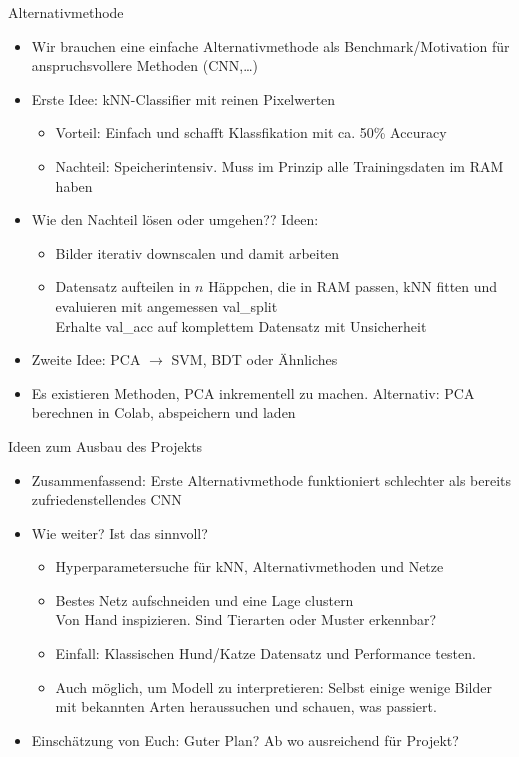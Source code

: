\documentclass[aspectratio=1610, 9pt]{beamer}
\begin{document}
\begin{frame}{Alternativmethode}

  \begin{itemize}
    \item Wir brauchen eine einfache Alternativmethode als Benchmark/Motivation für anspruchsvollere Methoden (CNN,\ldots)
    \item Erste Idee: kNN-Classifier mit reinen Pixelwerten
    \begin{itemize}
      \item Vorteil: Einfach und schafft Klassfikation mit ca. 50\% Accuracy
      \item Nachteil: Speicherintensiv. Muss im Prinzip alle Trainingsdaten im RAM haben
    \end{itemize}
    \item Wie den Nachteil lösen oder umgehen?? Ideen:
    \begin{itemize}
      \item Bilder iterativ downscalen und damit arbeiten
      \item Datensatz aufteilen in $n$ Häppchen, die in RAM passen, kNN fitten und evaluieren mit angemessen val\_split\\
      \rightarrow{} Erhalte val\_acc auf komplettem Datensatz mit Unsicherheit
    \end{itemize}
    \item Zweite Idee: PCA $\to$ SVM, BDT oder Ähnliches
    \item Es existieren Methoden, PCA inkrementell zu machen. Alternativ: PCA berechnen in Colab, abspeichern und laden
  \end{itemize}

\end{frame}


\begin{frame}{Ideen zum Ausbau des Projekts}

  \begin{itemize}
    \item Zusammenfassend: Erste Alternativmethode funktioniert schlechter als bereits zufriedenstellendes CNN
    \item Wie weiter? Ist das sinnvoll?
    \begin{itemize}
      \item Hyperparametersuche für kNN, Alternativmethoden und Netze
      \item Bestes Netz aufschneiden und eine Lage clustern\\
      \rightarrow{} Von Hand inspizieren. Sind Tierarten oder Muster erkennbar?
      \item Einfall: Klassischen Hund/Katze Datensatz und Performance testen.
      \item Auch möglich, um Modell zu interpretieren: Selbst einige wenige Bilder mit bekannten Arten heraussuchen und schauen, was passiert.
    \end{itemize}
    \item Einschätzung von Euch: Guter Plan? Ab wo ausreichend für Projekt?
  \end{itemize}

\end{frame}
\end{document}
